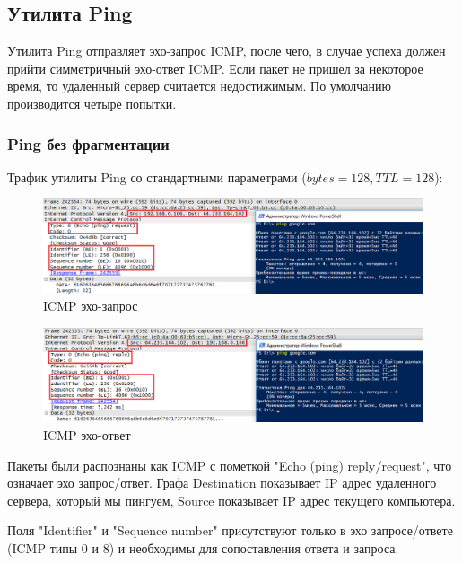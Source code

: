 \documentclass[14pt,a4paper,report]{report}
\begin{document}
\subsection{Утилита Ping}

Утилита Ping отправляет эхо-запрос ICMP, после чего, в случае успеха должен прийти симметричный эхо-ответ ICMP. Если пакет не пришел за некоторое время, то удаленный сервер считается недостижимым. По умолчанию производится четыре попытки.

\subsubsection{Ping без фрагментации}

Трафик утилиты Ping со стандартными параметрами ($bytes=128, TTL=128$):

\begin{figure}[h!]
	\centering
	\includegraphics[scale = 0.65]{images/ping1.png}
	
	\caption{ICMP эхо-запрос}
	\label{image:2}
\end{figure}

\begin{figure}[h!]
	\centering
	\includegraphics[scale = 0.65]{images/ping2.png}
	
	\caption{ICMP эхо-ответ}
	\label{image:3}
\end{figure}

Пакеты были распознаны как ICMP с пометкой "Echo (ping) reply/request", что означает эхо запрос/ответ. Графа Destination показывает IP адрес удаленного сервера, который мы пингуем, Source показывает IP адрес текущего компьютера.

Поля "Identifier" и "Sequence number" присутствуют только в эхо запросе/ответе (ICMP типы 0 и 8) и необходимы для сопоставления ответа и запроса.
\end{document}
